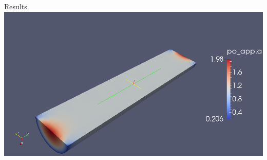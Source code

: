 \documentclass{beamer}
\begin{document}
\begin{frame}{Results}
\centering
\includegraphics[scale=0.2]{psi0-clip}
\begin{figure}[H]
\end{figure}
\end{frame}
\end{document}
